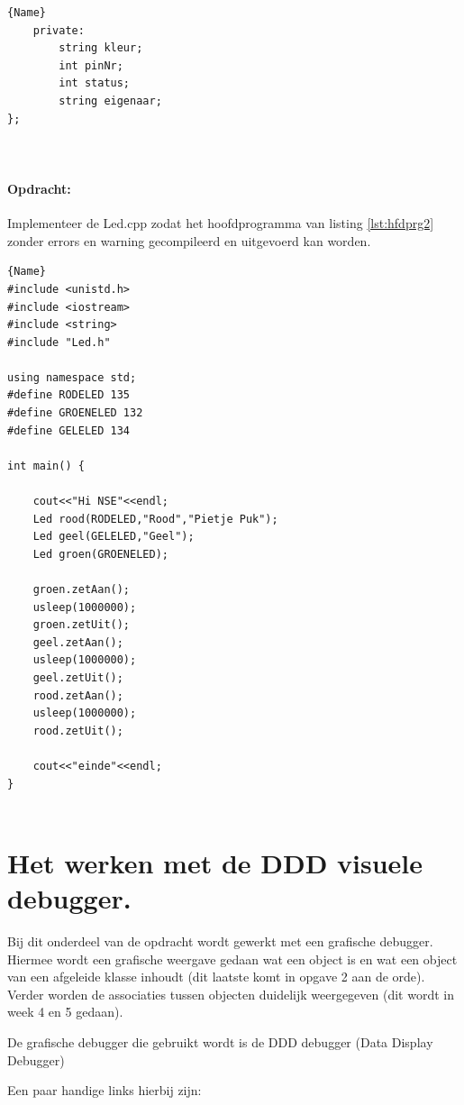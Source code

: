 \begin{enumerate}
\begin{itemize}
\begin{minipage}{.45\textwidth}
\begin{lstlisting}[caption=LED declaratie file(.h),frame=tlrb,label={lst:ledH}]{Name}
	private:
		string kleur;
		int pinNr;
		int status;  
		string eigenaar;
};
		
		
	\end{lstlisting}
	
\end{minipage}

\newpage	
\paragraph{Opdracht:} Implementeer de Led.cpp zodat het hoofdprogramma van listing \ref{lst:hfdprg2} zonder errors en warning gecompileerd en uitgevoerd kan worden. 
\begin{lstlisting}[caption=Hoofdprogramma om de LED uit te testen ,frame=tlrb, label={lst:hfdprg2}]{Name}
#include <unistd.h>
#include <iostream>
#include <string>
#include "Led.h"

using namespace std;
#define RODELED 135
#define GROENELED 132
#define GELELED 134

int main() {
	
	cout<<"Hi NSE"<<endl;
	Led rood(RODELED,"Rood","Pietje Puk");
	Led geel(GELELED,"Geel");
	Led groen(GROENELED);
	
	groen.zetAan();
	usleep(1000000);
	groen.zetUit();
	geel.zetAan();
	usleep(1000000);
	geel.zetUit();
	rood.zetAan();
	usleep(1000000);  
	rood.zetUit();
	
	cout<<"einde"<<endl;
}


\end{lstlisting}	
\end{itemize}


    \end{enumerate}


\section{Het werken met de DDD visuele debugger.} \label{sec:startDDD}
 
Bij dit onderdeel van de opdracht wordt gewerkt met een grafische debugger. Hiermee wordt een grafische weergave gedaan wat een object is en wat een object van een afgeleide klasse inhoudt (dit laatste komt in opgave 2 aan de orde). Verder worden de associaties tussen objecten duidelijk weergegeven (dit wordt in week 4 en 5 gedaan).

De grafische debugger die gebruikt wordt is de DDD debugger (Data Display Debugger) 


Een paar handige links hierbij zijn:

